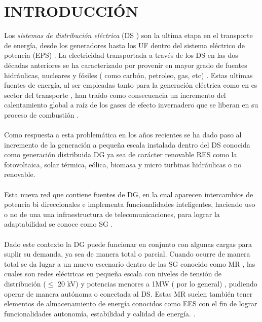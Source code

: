 \documentclass[12pt, letterpaper]{report}
\begin{document}
\chapter*{INTRODUCCIÓN}
Los \textit{sistemas de distribución eléctrica} (\ac{DS} ) son la ultima etapa en el transporte de energía,  desde los generadores hasta los \ac{UF} dentro del sistema eléctrico de potencia (\ac{EPS}) \cite{basso2004ieee}. La electricidad transportada a través de los \ac{DS} en las dos décadas anteriores se ha caracterizado por provenir en mayor grado de fuentes hidráulicas, nucleares y  fósiles ( como carbón, petroleo, gas, etc) \cite{Bacha2015}. Estas ultimas fuentes de energía, al ser empleadas tanto para la generación eléctrica como en es sector del transporte \cite{Bahmanifirouzi2012}, han traído como consecuencia un incremento del calentamiento global a raíz  de los gases de efecto invernadero que se liberan en  su proceso de combustión  \cite{Hauck2017}.\\\\
Como respuesta a esta problemática en los años recientes se ha dado  paso al incremento de la generación a pequeña  escala instalada dentro del \ac{DS} conocida como generación distribuida  \ac{DG} ya sea de carácter renovable   \ac{RES} como la fotovoltaica, solar térmica, eólica, biomasa y micro turbinas hidráulicas  \cite{Calderaro2014} o no renovable. \\\\
Esta nueva red que contiene fuentes de \ac{DG}, en la cual aparecen intercambios de potencia bi direccionales  e implementa funcionalidades inteligentes,  haciendo uso  o no de una una infraestructura de telecomunicaciones, para lograr la adaptabilidad se conoce como \ac{SG} \cite{Bhatt2014}.\\\\ 
Dado este contexto la \ac{DG} puede funcionar  en conjunto con  algunas cargas para suplir su demanda, ya sea de manera total o  parcial. Cuando ocurre de manera total se da lugar a  un muevo escenario dentro de las \ac{SG}  conocido como \ac{MR} \cite{Pegueroles-Queralt2012}, las cuales son redes eléctricas en pequeña escala  con niveles de tensión de distribución ($\leq$ 20 kV)  y potencias menores a 1MW ( por lo general) \cite{Bacha2015}, pudiendo operar de manera autónoma o  conectada al \ac{DS}. Estas \ac{MR} suelen también  tener elementos de almacenamiento de energía conocidos como \ac{EES} \cite{Colak2015} con el fin de lograr funcionalidades autonomía, estabilidad  y calidad de energía.  \cite{Babacan2017} \cite{Pegueroles-Queralt2012}.\\\\ 
\end{document}
